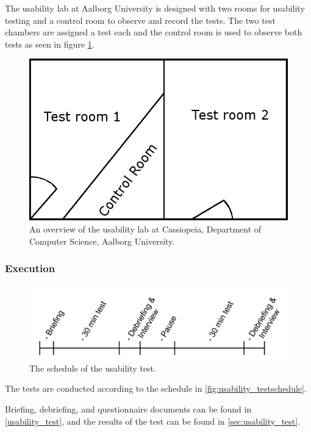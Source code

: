 The usability lab at Aalborg University is designed with two rooms for usability testing and a control room to observe and record the tests.
The two test chambers are assigned a test each and the control room is used to observe both tests as seen in figure \ref{fig:test_setup}.

\begin{figure}[!h]
	\centering
		\includegraphics[width=\textwidth]{gfx/test_setup.png}
	\caption{An overview of the usability lab at Cassiopeia, Department of Computer Science, Aalborg University.}
	\label{fig:test_setup}
\end{figure}

\subsubsection{Execution}

\begin{figure}[!h]
	\centering
		\includegraphics[width=\textwidth]{gfx/usability_testschedule.png}
	\caption{The schedule of the usability test.}
	\label{fig:usability_testschedule}
\end{figure}

The tests are conducted according to the schedule in \autoref{fig:usability_testschedule}.

Briefing, debriefing, and questionnaire documents can be found in \autoref{usability_test}, and the results of the test can be found in \autoref{sec:usability_test}.